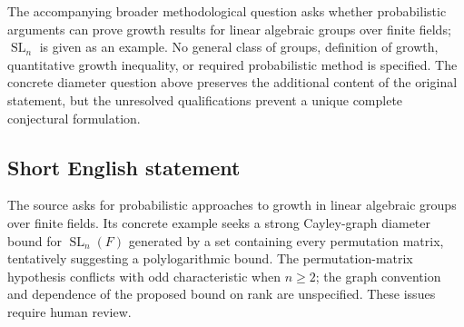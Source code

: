\documentclass[11pt]{article}
\begin{document}
The accompanying broader methodological question asks whether probabilistic arguments can prove growth results for linear algebraic groups over finite fields; \(\operatorname{SL}_n\) is given as an example. No general class of groups, definition of growth, quantitative growth inequality, or required probabilistic method is specified. The concrete diameter question above preserves the additional content of the original statement, but the unresolved qualifications prevent a unique complete conjectural formulation.
\subsection{Short English statement}
The source asks for probabilistic approaches to growth in linear algebraic groups over finite fields. Its concrete example seeks a strong Cayley-graph diameter bound for \(\operatorname{SL}_n(F)\) generated by a set containing every permutation matrix, tentatively suggesting a polylogarithmic bound. The permutation-matrix hypothesis conflicts with odd characteristic when \(n\geq2\); the graph convention and dependence of the proposed bound on rank are unspecified. These issues require human review.
\end{document}
